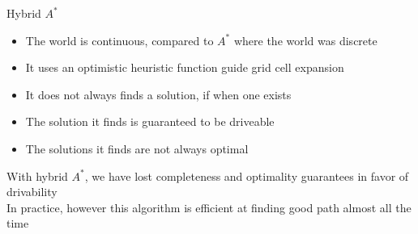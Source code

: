 \documentclass[10pt,mathserif]{beamer}
\begin{document}
\begin{frame}{Hybrid $A^*$}
\begin{itemize}
\item The world is continuous, compared to $A^*$ where the world was discrete
\item It uses an optimistic heuristic function guide grid cell expansion
\item It does not always finds a solution, if when one exists
\item The solution it finds is guaranteed to be driveable
\item The solutions it finds are not always optimal
\end{itemize}
With hybrid $A^*$, we have lost completeness and optimality guarantees in favor of 
drivability\\
In practice, however this algorithm is efficient at finding good path almost all the time
\end{frame}


\begin{frame}

\end{frame}
\end{document}
